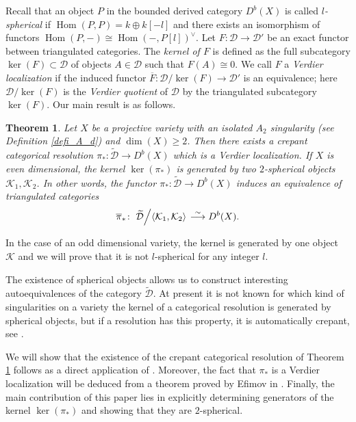 \documentclass[a4paper, twoside, 11pt]{amsart}
\newtheorem{theorem}{Theorem}[section]
\theoremstyle{definition}
\theoremstyle{remark}
\numberwithin{equation}{theorem}
\DeclareMathOperator{\Hom}{Hom}
\newcommand{\dbx}{D^b(X)}
\begin{document}
Recall that an object $P$ in the bounded derived category $\dbx$ is called $l$\textit{-spherical} if $\Hom(P, P) = k \oplus k[-l]$ and there exists an isomorphism of functors $\Hom(P,-) \cong \Hom(-,P[l])^\vee$. Let $F\colon \mathcal{D} \to \mathcal{D}'$ be an exact functor between triangulated categories. The \textit{kernel of $F$} is defined as the full subcategory $\ker(F)\subset \mathcal{D}$ of objects $A\in \mathcal{D}$ such that $F(A) \cong 0$. We call $F$ a \textit{Verdier localization} if the induced functor $\overline{F}\colon \mathcal{D}/\ker(F) \to \mathcal{D'}$ is an equivalence; here $\mathcal{D}/\ker(F)$ is the \textit{Verdier quotient} of $\mathcal{D}$ by the triangulated subcategory $\ker(F)$.
Our main result is as follows. 
\begin{theorem}\label{MAIN}
   Let $X$ be a projective variety with an isolated $A_2$ singularity (see Definition \ref{defi_A_d}) and $\dim(X) \geq 2$. Then there exists a crepant categorical resolution $\pi_*\colon \widetilde{\mathcal{D}} \to \dbx$ which is a Verdier localization. If $X$ is even dimensional, the kernel $\ker(\pi_*)$
   is generated by two $2$-spherical objects $\mathcal{K}_1, \mathcal{K}_2$. In other words, the functor $\pi_*\colon \widetilde{\mathcal{D}} \to  \dbx$ induces an equivalence of triangulated categories 
	\begin{equation*}
		\overline{\pi}_* \colon \left. \widetilde{\mathcal{D}} \middle/ \langle \mathcal{K}_1,\mathcal{K}_2 \rangle  \right.\overset{\sim}{\longrightarrow} \dbx.
	\end{equation*}
\end{theorem}
In the case of an odd dimensional variety, the kernel is generated by one object $\mathcal{K}$ and we will prove that it is not $l$-spherical for any integer $l$. 

The existence of spherical objects allows us to construct interesting autoequivalences of the category $\widetilde{\mathcal{D}}$. At present it is not known for which kind of singularities on a variety the kernel of a categorical resolution is generated by spherical objects, but if a resolution has this property, it is automatically crepant, see \cite[Lemma 5.8]{hfd}. 

We will show that the existence of the crepant categorical resolution of Theorem \ref{MAIN} follows as a direct application of \cite[§4]{Lefschetz_Decomp}. Moreover, the fact that $\pi_*$ is a Verdier localization will be deduced from a theorem proved by Efimov in \cite[§8]{Efimov_key}. Finally, the main contribution of this paper lies in explicitly determining generators of the kernel $\ker(\pi_*)$ and showing that they are $2$-spherical. 
\end{document}
